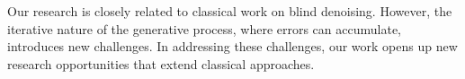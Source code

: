 Our research is closely related to classical work on blind denoising. However, the iterative nature of the generative process, where errors can accumulate, introduces new challenges. In addressing these challenges, our work opens up new research opportunities that extend classical approaches.






